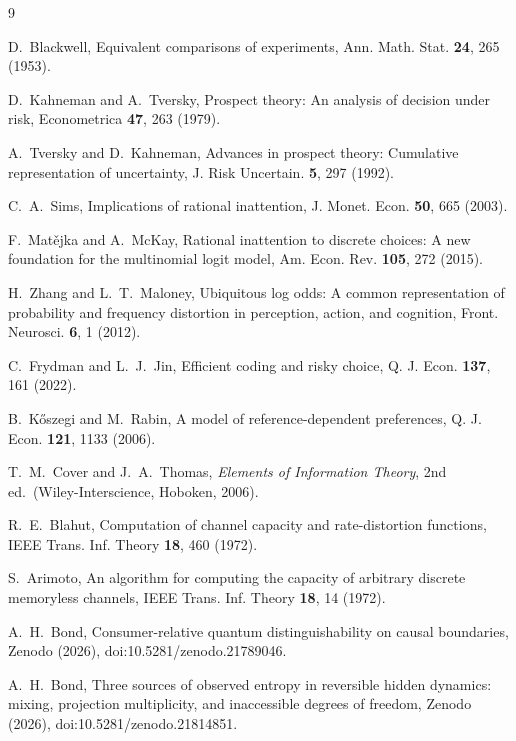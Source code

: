 \documentclass[aps,pre,reprint,nofootinbib]{revtex4-2}
\begin{document}
\begin{thebibliography}{9}

D.~Blackwell,
Equivalent comparisons of experiments,
Ann. Math. Stat. \textbf{24}, 265 (1953).

D.~Kahneman and A.~Tversky,
Prospect theory: An analysis of decision under risk,
Econometrica \textbf{47}, 263 (1979).

A.~Tversky and D.~Kahneman,
Advances in prospect theory: Cumulative representation of
uncertainty,
J. Risk Uncertain. \textbf{5}, 297 (1992).

C.~A.~Sims,
Implications of rational inattention,
J. Monet. Econ. \textbf{50}, 665 (2003).

F.~Mat\v{e}jka and A.~McKay,
Rational inattention to discrete choices: A new foundation for the
multinomial logit model,
Am. Econ. Rev. \textbf{105}, 272 (2015).

H.~Zhang and L.~T.~Maloney,
Ubiquitous log odds: A common representation of probability and
frequency distortion in perception, action, and cognition,
Front. Neurosci. \textbf{6}, 1 (2012).

C.~Frydman and L.~J.~Jin,
Efficient coding and risky choice,
Q. J. Econ. \textbf{137}, 161 (2022).

B.~K\H{o}szegi and M.~Rabin,
A model of reference-dependent preferences,
Q. J. Econ. \textbf{121}, 1133 (2006).

T.~M.~Cover and J.~A.~Thomas,
\emph{Elements of Information Theory}, 2nd ed.\
(Wiley-Interscience, Hoboken, 2006).

R.~E.~Blahut,
Computation of channel capacity and rate-distortion functions,
IEEE Trans. Inf. Theory \textbf{18}, 460 (1972).

S.~Arimoto,
An algorithm for computing the capacity of arbitrary discrete
memoryless channels,
IEEE Trans. Inf. Theory \textbf{18}, 14 (1972).

A.~H.~Bond,
Consumer-relative quantum distinguishability on causal boundaries,
Zenodo (2026), doi:10.5281/zenodo.21789046.

A.~H.~Bond,
Three sources of observed entropy in reversible hidden dynamics:
mixing, projection multiplicity, and inaccessible degrees of freedom,
Zenodo (2026), doi:10.5281/zenodo.21814851.

\end{thebibliography}
\end{document}
